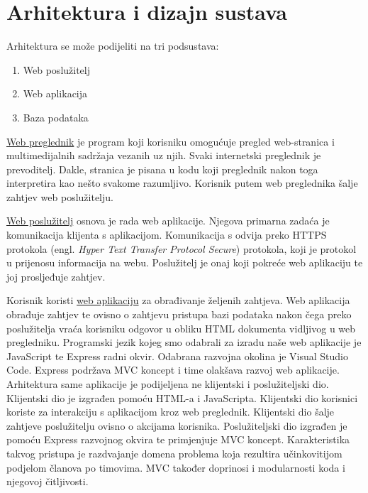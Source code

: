 \chapter{Arhitektura i dizajn sustava}
		
	
	Arhitektura se može podijeliti na tri podsustava:
	\begin{enumerate}
		\item Web poslužitelj
		\item Web aplikacija
		\item Baza podataka
	\end{enumerate}
	
	\underline{Web preglednik} je program koji korisniku omogućuje pregled web-stranica i multimedijalnih sadržaja vezanih uz njih. Svaki internetski preglednik je prevoditelj. Dakle, stranica je pisana u kodu koji preglednik nakon toga interpretira kao nešto svakome razumljivo. Korisnik putem web preglednika šalje zahtjev web poslužitelju.
	
	\underline{Web poslužitelj} osnova je rada web aplikacije. Njegova primarna zadaća je komunikacija klijenta s aplikacijom. Komunikacija s odvija preko HTTPS protokola (engl. \textit{Hyper Text Transfer Protocol Secure}) protokola, koji je protokol u prijenosu informacija na webu. Poslužitelj je onaj koji pokreće web aplikaciju te joj prosljeđuje zahtjev.
	
	Korisnik koristi \underline{web aplikaciju} za obrađivanje željenih zahtjeva. Web aplikacija obrađuje zahtjev te ovisno o zahtjevu pristupa bazi podataka nakon čega preko poslužitelja vraća korisniku odgovor u obliku HTML dokumenta vidljivog u web pregledniku. Programski jezik kojeg smo odabrali za izradu naše web aplikacije je JavaScript te Express radni okvir. Odabrana razvojna okolina je Visual Studio Code. Express podržava MVC koncept i time olakšava razvoj web aplikacije. Arhitektura same aplikacije je podijeljena ne klijentski i poslužiteljski dio. Klijentski dio je izgrađen pomoću HTML-a i JavaScripta. Klijentski dio korisnici koriste za interakciju s aplikacijom kroz web preglednik. Klijentski dio šalje zahtjeve poslužitelju ovisno o akcijama korisnika. Poslužiteljski dio izgrađen je pomoću Express razvojnog okvira te primjenjuje MVC koncept. Karakteristika takvog pristupa je razdvajanje domena problema koja rezultira učinkovitijom podjelom članova po timovima. MVC također doprinosi i modularnosti koda i njegovoj čitljivosti.

	
		

